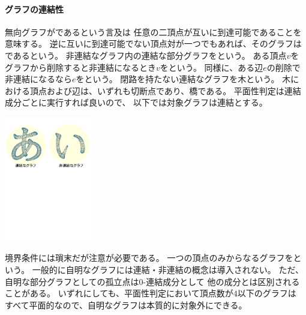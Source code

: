 \begin{paracol}{2}
\paragraph{グラフの連結性}
無向グラフがであるという言及は
任意の二頂点が互いに到達可能であることを意味する。
逆に互いに到達可能でない頂点対が一つでもあれば、そのグラフはであるという。
非連結なグラフ内の連結な部分グラフをという。
ある頂点$v$をグラフから削除すると非連結になるとき$v$をという。
同様に、ある辺$e$の削除で非連結になるなら$e$をという。
閉路を持たない連結なグラフを木という。
木における頂点および辺は、いずれも切断点であり、橋である。
平面性判定は連結成分ごとに実行すれば良いので、
以下では対象グラフは連結とする。

\switchcolumn
\vspace{1.5\intextsep}
\centering
\includegraphics[width=0.29\textwidth]{figures/connect_ai.pdf}
\end{paracol}


境界条件には瑣末だが注意が必要である。
一つの頂点のみからなるグラフをという。
一般的に自明なグラフには連結・非連結の概念は導入されない。
ただ、自明な部分グラフとしての孤立点は$0$-連結成分として
他の成分とは区別されることがある。
いずれにしても、平面性判定において頂点数が$4$以下のグラフは
すべて平面的なので、自明なグラフは本質的に対象外にできる。








